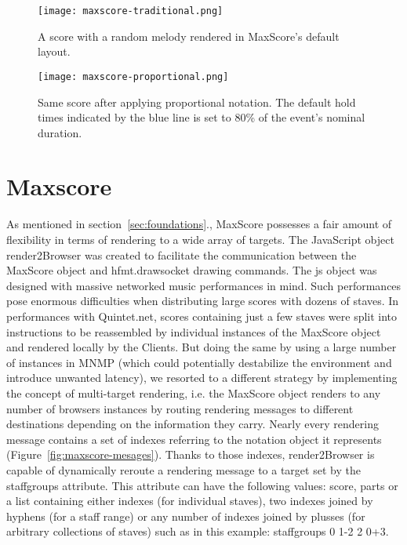
\begin{figure*}[h]
    \centering
    \begin{minipage}{0.45\textwidth}
        \centering
        \texttt{[image: maxscore-traditional.png]} 
                \caption{A score with a random melody rendered in MaxScore’s default layout.
        \label{fig:maxscore-traditional}}
    \end{minipage}\hfill
    \begin{minipage}{0.45\textwidth}
        \centering
        \texttt{[image: maxscore-proportional.png]} 
       	\caption{Same score after applying proportional notation. The default hold times indicated by the blue line is set to 80\% of the event’s nominal duration.
\label{fig:maxscore-proportional}}
    \end{minipage}
\end{figure*}

\section{Maxscore}
As mentioned in section~\ref{sec:foundations}., MaxScore possesses a fair amount of flexibility in terms of rendering to a wide array of targets. The JavaScript object render2Browser was created to facilitate the communication between the MaxScore object and hfmt.drawsocket drawing commands. The js object was designed with massive networked music performances in mind. Such performances pose enormous difficulties when distributing large scores with dozens of staves. In performances with Quintet.net, scores containing just a few staves were split into instructions to be reassembled by individual instances of the MaxScore object and rendered locally by the Clients. But doing the same by using a large number of instances in MNMP (which could potentially destabilize the environment and introduce unwanted latency), we resorted to a different strategy by implementing the concept of multi-target rendering, i.e. the MaxScore object renders to any number of browsers instances by routing rendering messages to different destinations depending on the information they carry. Nearly every rendering message contains a set of indexes referring to the notation object it represents (Figure~\ref{fig:maxscore-mesages}). Thanks to those indexes, render2Browser is capable of dynamically reroute a rendering message to a target set by the staffgroups attribute. This attribute can have the following values: score, parts or a list containing either indexes (for individual staves), two indexes joined by hyphens (for a staff range) or any number of indexes joined by plusses (for arbitrary collections of staves) such as in this example: staffgroups 0 1-2 2 0+3.

